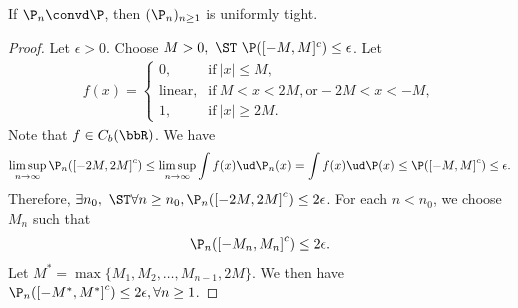 \documentclass[../aipt.tex]{subfiles}
\begin{document}
%
\begin{Lemma}\label{wk9:lem:convd_implies_uniform_tightness}
If $\P_n \convd \P$, then $(\P_n)_{n \geq 1}$ is uniformly tight.
\end{Lemma}
%
\begin{proof}
Let $\epsilon > 0$. Choose $M > 0, \ \ST\ \P({[-M, M]^c}) \leq \epsilon$.
Let
\begin{align*}
f(x) = 
\begin{cases}
    0, & \text{if}\ |x| \leq M, \\
    \text{linear}, & \text{if}\ M < x < 2M, \text{or} -2M < x < -M, \\
    1, & \text{if}\ |x| \geq 2M.
\end{cases}
\end{align*}
Note that $f \in C_b(\bbR)$. We have
\begin{align*}
\limsup_{n \to \infty} \P_n(\left[ -2M, 2M \right]^c)
\leq \limsup_{n \to \infty} \int f(x) \ud\P_n(x)
= \int f(x) \ud\P(x) 
\leq \P(\left[ -M, M \right]^c) 
\leq \epsilon.
\end{align*}
Therefore, $\exists n_0, \ \ST \forall n \geq n_0, \P_n(\left[ -2M, 2M \right]^c) \leq 2\epsilon$.
For each $n < n_0$, we choose $M_n$ such that
\begin{align*}
\P_n(\left[ -M_n, M_n \right]^c) \leq 2\epsilon.
\end{align*}
Let $M^* = \max \{M_1, M_2, \ldots, M_{n-1}, 2M\}$. We then have $\P_n(\left[ -M^*, M^* \right]^c) \leq 2\epsilon, \forall n \geq 1$.
\end{proof}


%
%
%

\end{document}

